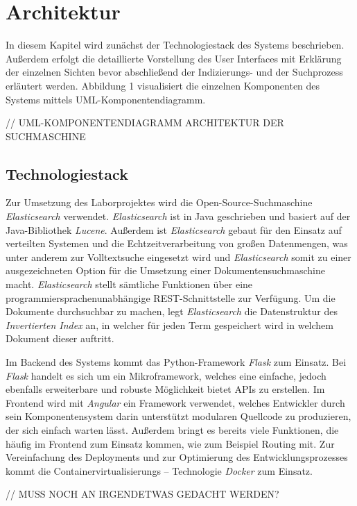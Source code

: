 \documentclass[11pt,a4paper, halfparskip]{scrartcl}
\begin{document}
\section{Architektur}

In diesem Kapitel wird zunächst der Technologiestack des Systems beschrieben. 
Außerdem erfolgt die detaillierte Vorstellung des User Interfaces mit Erklärung der einzelnen Sichten bevor abschließend der Indizierungs- und der Suchprozess erläutert werden.
Abbildung 1 visualisiert die einzelnen Komponenten des Systems mittels UML-Komponentendiagramm. 

// UML-KOMPONENTENDIAGRAMM ARCHITEKTUR DER SUCHMASCHINE 

\subsection{Technologiestack}

Zur Umsetzung des Laborprojektes wird die Open-Source-Suchmaschine \textit{Elasticsearch} verwendet. 
\textit{Elasticsearch} ist in Java geschrieben und basiert auf der Java-Bibliothek \textit{Lucene}. 
Außerdem ist \textit{Elasticsearch} gebaut für den Einsatz auf verteilten Systemen und die Echtzeitverarbeitung von großen Datenmengen, was unter anderem zur Volltextsuche eingesetzt wird und \textit{Elasticsearch} somit zu einer ausgezeichneten Option für die Umsetzung einer Dokumentensuchmaschine macht.
\textit{Elasticsearch} stellt sämtliche Funktionen über eine programmiersprachenunabhängige REST-Schnittstelle zur Verfügung.
Um die Dokumente durchsuchbar zu machen, legt \textit{Elasticsearch} die Datenstruktur des \textit{Invertierten Index} an, in welcher für jeden Term gespeichert wird in welchem Dokument dieser auftritt.

Im Backend des Systems kommt das Python-Framework \textit{Flask} zum Einsatz. 
Bei \textit{Flask} handelt es sich um ein Mikroframework, welches eine einfache, jedoch ebenfalls erweiterbare und robuste Möglichkeit bietet APIs zu erstellen.
Im Frontend wird mit \textit{Angular} ein Framework verwendet, welches Entwickler durch sein Komponentensystem darin unterstützt modularen Quellcode zu produzieren, der sich einfach warten lässt.
Außerdem bringt es bereits viele Funktionen, die häufig im Frontend zum Einsatz kommen, wie zum Beispiel Routing mit. 
Zur Vereinfachung des Deployments und zur Optimierung des Entwicklungsprozesses kommt die Containervirtualisierungs – Technologie \textit{Docker} zum Einsatz.

// MUSS NOCH AN IRGENDETWAS GEDACHT WERDEN?
\end{document}
